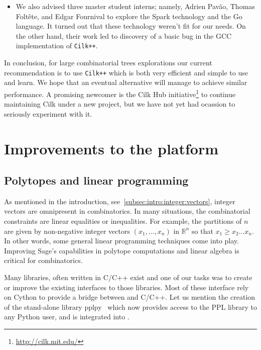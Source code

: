 \documentclass{deliverablereport}
\newcommand{\CilkP}{\texttt{Cilk++}\xspace}
\begin{document}
\begin{itemize}
\item We also advised three master student interns; namely, Adrien Pavão,
  Thomas Foltête, and Edgar Fournival to explore the Spark technology and the
  Go language. It turned out that these technology weren't fit for our
  needs. On the other hand, their work led to discovery of a basic bug in the GCC
  implementation of \CilkP \cite{gcc-bug-80038}.
\end{itemize}

In conclusion, for large combinatorial trees explorations our current
recommendation is to use \CilkP which is both very efficient and simple to use
and learn. We hope that an eventual alternative will manage to achieve similar
performance. A promising newcomer is the Cilk Hub initiative\footnote{\url{http://cilk.mit.edu/}}
to continue maintaining Cilk under a new project, but we have not yet had ocassion to seriously
experiment with it.




\section{Improvements to the \Sage platform}


\subsection{Polytopes and linear programming}
\label{subsec:polytopes}

As mentioned in the introduction, see~\ref{subsec:intro:integer:vectors},
integer vectors are omnipresent in combinatorics. In many situations,
the combinatorial constraints are linear equalities or inequalities.
For example, the partitions of $n$ are given by non-negative integer
vectors $(x_1, \ldots, x_n)$ in $\mathbb{R}^n$ so that $x_1 \geq x_2 \ldots x_n$.
In other words, some general linear programming techniques come into
play. Improving Sage's capabilities in polytope computations and linear algebra
is critical for combinatorics.

Many libraries, often written in C/C++ exist and one of our tasks was to
create or improve the existing \Sage interfaces to those libraries. Most of these interface
rely on Cython to provide a bridge between \Python and C/C++. Let
us mention the creation of the stand-alone library pplpy~\cite{pplpy-code} which now provides
access to the PPL library to any Python user, and is integrated into \Sage.
\end{document}
